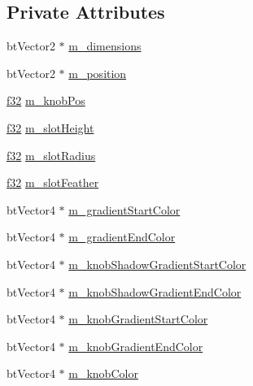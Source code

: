 \subsection*{Private Attributes}
\begin{DoxyCompactItemize}
\item 
bt\+Vector2 $\ast$ \mbox{\hyperlink{classnjli_1_1_slider_h_u_d_a0b02cb21788a357fb319b8e788338196}{m\+\_\+dimensions}}
\item 
bt\+Vector2 $\ast$ \mbox{\hyperlink{classnjli_1_1_slider_h_u_d_a4345d7ad18c82bffdd598fa040dcf95f}{m\+\_\+position}}
\item 
\mbox{\hyperlink{_util_8h_a5f6906312a689f27d70e9d086649d3fd}{f32}} \mbox{\hyperlink{classnjli_1_1_slider_h_u_d_a2f5beb25d041a338881130f604b76c48}{m\+\_\+knob\+Pos}}
\item 
\mbox{\hyperlink{_util_8h_a5f6906312a689f27d70e9d086649d3fd}{f32}} \mbox{\hyperlink{classnjli_1_1_slider_h_u_d_adca46e42811634fb76694319deb9cce6}{m\+\_\+slot\+Height}}
\item 
\mbox{\hyperlink{_util_8h_a5f6906312a689f27d70e9d086649d3fd}{f32}} \mbox{\hyperlink{classnjli_1_1_slider_h_u_d_a983798d2710f43d303b8b0d573cd041a}{m\+\_\+slot\+Radius}}
\item 
\mbox{\hyperlink{_util_8h_a5f6906312a689f27d70e9d086649d3fd}{f32}} \mbox{\hyperlink{classnjli_1_1_slider_h_u_d_aec325cfe3424cc232b5fe653e2ca6868}{m\+\_\+slot\+Feather}}
\item 
bt\+Vector4 $\ast$ \mbox{\hyperlink{classnjli_1_1_slider_h_u_d_a52343c794850b57c10fe8ae72a89f18e}{m\+\_\+gradient\+Start\+Color}}
\item 
bt\+Vector4 $\ast$ \mbox{\hyperlink{classnjli_1_1_slider_h_u_d_a17b3288b1e99144187f62ad925e36a84}{m\+\_\+gradient\+End\+Color}}
\item 
bt\+Vector4 $\ast$ \mbox{\hyperlink{classnjli_1_1_slider_h_u_d_a72fffbbb906af2c53bcd4ae214720725}{m\+\_\+knob\+Shadow\+Gradient\+Start\+Color}}
\item 
bt\+Vector4 $\ast$ \mbox{\hyperlink{classnjli_1_1_slider_h_u_d_a8eb7e4813c2c5db6b4017c122fc51109}{m\+\_\+knob\+Shadow\+Gradient\+End\+Color}}
\item 
bt\+Vector4 $\ast$ \mbox{\hyperlink{classnjli_1_1_slider_h_u_d_a72191d6f3cf8188a0a84f26058700430}{m\+\_\+knob\+Gradient\+Start\+Color}}
\item 
bt\+Vector4 $\ast$ \mbox{\hyperlink{classnjli_1_1_slider_h_u_d_a63a84c5b27d77d69697e02540ea40c80}{m\+\_\+knob\+Gradient\+End\+Color}}
\item 
bt\+Vector4 $\ast$ \mbox{\hyperlink{classnjli_1_1_slider_h_u_d_aa2045a80a0751ba59755d073d44087dc}{m\+\_\+knob\+Color}}
\end{DoxyCompactItemize}
